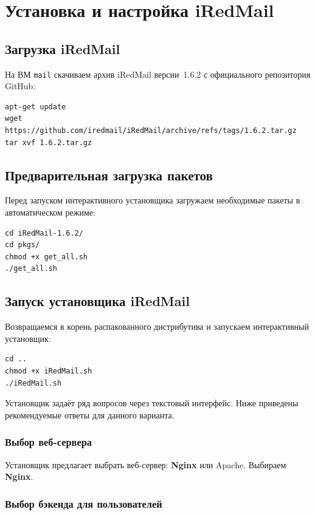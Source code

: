 \chapter{Установка и настройка iRedMail}
\label{ch:practice}

\section{Загрузка iRedMail}

На ВМ \texttt{mail} скачиваем архив iRedMail версии~1.6.2
с официального репозитория GitHub:

\begin{lstlisting}
apt-get update
wget https://github.com/iredmail/iRedMail/archive/refs/tags/1.6.2.tar.gz
tar xvf 1.6.2.tar.gz
\end{lstlisting}

\section{Предварительная загрузка пакетов}

Перед запуском интерактивного установщика загружаем необходимые
пакеты в автоматическом режиме:

\begin{lstlisting}
cd iRedMail-1.6.2/
cd pkgs/
chmod +x get_all.sh
./get_all.sh
\end{lstlisting}

\section{Запуск установщика iRedMail}

Возвращаемся в корень распакованного дистрибутива и запускаем
интерактивный установщик:

\begin{lstlisting}
cd ..
chmod +x iRedMail.sh
./iRedMail.sh
\end{lstlisting}

Установщик задаёт ряд вопросов через текстовый интерфейс.
Ниже приведены рекомендуемые ответы для данного варианта.

\subsection{Выбор веб-сервера}

Установщик предлагает выбрать веб-сервер: \textbf{Nginx} или Apache.
Выбираем \textbf{Nginx}.

\subsection{Выбор бэкенда для пользователей}

